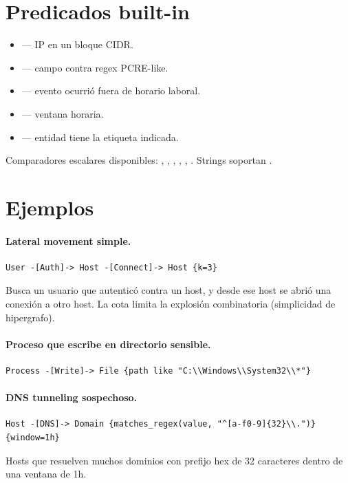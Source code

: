 \section{Predicados built-in}

\begin{itemize}
    \item {} — IP en un bloque CIDR.
    \item {} — campo contra
    regex PCRE-like.
    \item {} — evento ocurrió fuera de horario
    laboral.
    \item {} — ventana horaria.
    \item {} — entidad tiene la etiqueta indicada.
\end{itemize}

Comparadores escalares disponibles: \code{=}, \code{!=}, \code{>},
\code{>=}, \code{<}, \code{<=}. Strings soportan .

\section{Ejemplos}

\paragraph{Lateral movement simple.}
\begin{lstlisting}[basicstyle=\ttfamily\small]
User -[Auth]-> Host -[Connect]-> Host {k=3}
\end{lstlisting}
Busca un usuario que autenticó contra un host, y desde ese host se
abrió una conexión a otro host. La cota  limita la
explosión combinatoria (simplicidad de hipergrafo).

\paragraph{Proceso que escribe en directorio sensible.}
\begin{lstlisting}[basicstyle=\ttfamily\small]
Process -[Write]-> File {path like "C:\\Windows\\System32\\*"}
\end{lstlisting}

\paragraph{DNS tunneling sospechoso.}
\begin{lstlisting}[basicstyle=\ttfamily\small]
Host -[DNS]-> Domain {matches_regex(value, "^[a-f0-9]{32}\\.")}
{window=1h}
\end{lstlisting}
Hosts que resuelven muchos dominios con prefijo hex de 32
caracteres dentro de una ventana de 1h.


